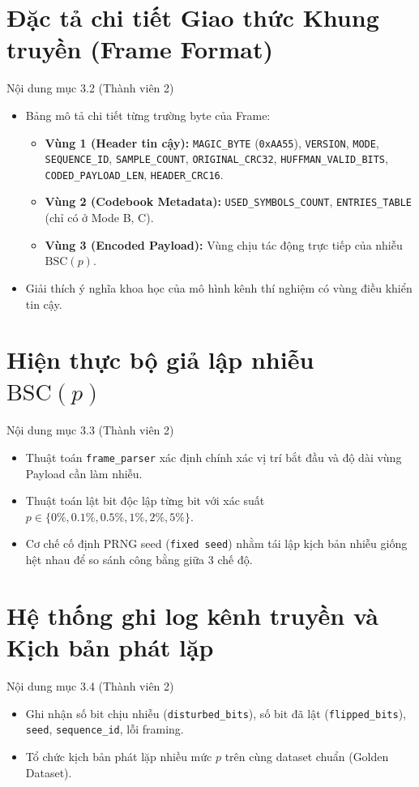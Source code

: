 \documentclass[12pt,a4paper]{report}
\begin{document}
\section{Đặc tả chi tiết Giao thức Khung truyền (Frame Format)}
\begin{notebox}{Nội dung mục 3.2 (Thành viên 2)}
\begin{itemize}[leftmargin=*,nosep]
    \item Bảng mô tả chi tiết từng trường byte của Frame:
    \begin{itemize}[nosep]
        \item \textbf{Vùng 1 (Header tin cậy):} \texttt{MAGIC\_BYTE} (\texttt{0xAA55}), \texttt{VERSION}, \texttt{MODE}, \texttt{SEQUENCE\_ID}, \texttt{SAMPLE\_COUNT}, \texttt{ORIGINAL\_CRC32}, \texttt{HUFFMAN\_VALID\_BITS}, \texttt{CODED\_PAYLOAD\_LEN}, \texttt{HEADER\_CRC16}.
        \item \textbf{Vùng 2 (Codebook Metadata):} \texttt{USED\_SYMBOLS\_COUNT}, \texttt{ENTRIES\_TABLE} (chỉ có ở Mode B, C).
        \item \textbf{Vùng 3 (Encoded Payload):} Vùng chịu tác động trực tiếp của nhiễu $\text{BSC}(p)$.
    \end{itemize}
    \item Giải thích ý nghĩa khoa học của mô hình kênh thí nghiệm có vùng điều khiển tin cậy.
\end{itemize}
\end{notebox}

\section{Hiện thực bộ giả lập nhiễu $\text{BSC}(p)$}
\begin{notebox}{Nội dung mục 3.3 (Thành viên 2)}
\begin{itemize}[leftmargin=*,nosep]
    \item Thuật toán \texttt{frame\_parser} xác định chính xác vị trí bắt đầu và độ dài vùng Payload cần làm nhiễu.
    \item Thuật toán lật bit độc lập từng bit với xác suất $p \in \{0\%, 0.1\%, 0.5\%, 1\%, 2\%, 5\%\}$.
    \item Cơ chế cố định PRNG seed (\texttt{fixed seed}) nhằm tái lập kịch bản nhiễu giống hệt nhau để so sánh công bằng giữa 3 chế độ.
\end{itemize}
\end{notebox}

\section{Hệ thống ghi log kênh truyền và Kịch bản phát lặp}
\begin{notebox}{Nội dung mục 3.4 (Thành viên 2)}
\begin{itemize}[leftmargin=*,nosep]
    \item Ghi nhận số bit chịu nhiễu (\texttt{disturbed\_bits}), số bit đã lật (\texttt{flipped\_bits}), \texttt{seed}, \texttt{sequence\_id}, lỗi framing.
    \item Tổ chức kịch bản phát lặp nhiều mức $p$ trên cùng dataset chuẩn (Golden Dataset).
\end{itemize}
\end{notebox}
\end{document}
